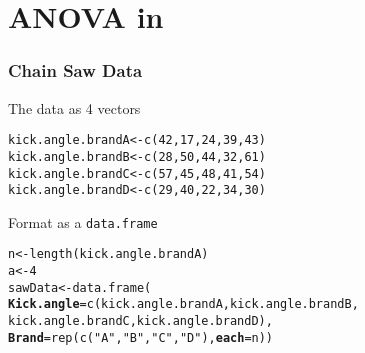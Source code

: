 \documentclass[color=usenames,dvipsnames]{beamer}\usepackage[]{graphicx}\usepackage[]{color}
\makeatletter
\newcommand{\hlnum}[1]{\textcolor[rgb]{0.69,0.494,0}{#1}}%
\newcommand{\hlstr}[1]{\textcolor[rgb]{0.749,0.012,0.012}{#1}}%
\newcommand{\hlstd}[1]{\textcolor[rgb]{0,0,0}{#1}}%
\newcommand{\hlkwb}[1]{\textcolor[rgb]{0,0.341,0.682}{#1}}%
\newcommand{\hlkwc}[1]{\textcolor[rgb]{0,0,0}{\textbf{#1}}}%
\newcommand{\hlkwd}[1]{\textcolor[rgb]{0.004,0.004,0.506}{#1}}%
\newenvironment{kframe}{%
 \def\at@end@of@kframe{}%
 \ifinner\ifhmode%
  \def\at@end@of@kframe{\end{minipage}}%
  \begin{minipage}{\columnwidth}%
 \fi\fi%
 \def\FrameCommand##1{\hskip\@totalleftmargin \hskip-\fboxsep
 \colorbox{shadecolor}{##1}\hskip-\fboxsep
     \hskip-\linewidth \hskip-\@totalleftmargin \hskip\columnwidth}%
 \MakeFramed {\advance\hsize-\width
   \@totalleftmargin\z@ \linewidth\hsize
   \@setminipage}}%
 {\par\unskip\endMakeFramed%
 \at@end@of@kframe}
\newenvironment{knitrout}{}{} %
\newcommand{\inr}[1]{\colorbox{inlinecolor}{\texttt{#1}}}
\makeatother
\begin{document}
\section{ANOVA in \R}









\begin{frame}[fragile]
  \frametitle{Chain Saw Data}
{%
  The data as 4 vectors}
\begin{knitrout}
\color{fgcolor}\begin{kframe}
\begin{alltt}
\hlstd{kick.angle.brandA} \hlkwb{<-} \hlkwd{c}\hlstd{(}\hlnum{42}\hlstd{,}\hlnum{17}\hlstd{,}\hlnum{24}\hlstd{,}\hlnum{39}\hlstd{,}\hlnum{43}\hlstd{)}
\hlstd{kick.angle.brandB} \hlkwb{<-} \hlkwd{c}\hlstd{(}\hlnum{28}\hlstd{,}\hlnum{50}\hlstd{,}\hlnum{44}\hlstd{,}\hlnum{32}\hlstd{,}\hlnum{61}\hlstd{)}
\hlstd{kick.angle.brandC} \hlkwb{<-} \hlkwd{c}\hlstd{(}\hlnum{57}\hlstd{,}\hlnum{45}\hlstd{,}\hlnum{48}\hlstd{,}\hlnum{41}\hlstd{,}\hlnum{54}\hlstd{)}
\hlstd{kick.angle.brandD} \hlkwb{<-} \hlkwd{c}\hlstd{(}\hlnum{29}\hlstd{,}\hlnum{40}\hlstd{,}\hlnum{22}\hlstd{,}\hlnum{34}\hlstd{,}\hlnum{30}\hlstd{)}
\end{alltt}
\end{kframe}
\end{knitrout}
\pause
\vspace{0.5cm}
{%
  Format as a \inr{data.frame}}
\begin{knitrout}
\color{fgcolor}\begin{kframe}
\begin{alltt}
\hlstd{n} \hlkwb{<-} \hlkwd{length}\hlstd{(kick.angle.brandA)}
\hlstd{a} \hlkwb{<-} \hlnum{4}
\hlstd{sawData} \hlkwb{<-} \hlkwd{data.frame}\hlstd{(}
    \hlkwc{Kick.angle}\hlstd{=}\hlkwd{c}\hlstd{(kick.angle.brandA, kick.angle.brandB,}
        \hlstd{kick.angle.brandC, kick.angle.brandD),}
    \hlkwc{Brand}\hlstd{=}\hlkwd{rep}\hlstd{(}\hlkwd{c}\hlstd{(}\hlstr{"A"}\hlstd{,}\hlstr{"B"}\hlstd{,}\hlstr{"C"}\hlstd{,}\hlstr{"D"}\hlstd{),} \hlkwc{each}\hlstd{=n))}
\end{alltt}
\end{kframe}
\end{knitrout}
\end{frame}
\end{document}
